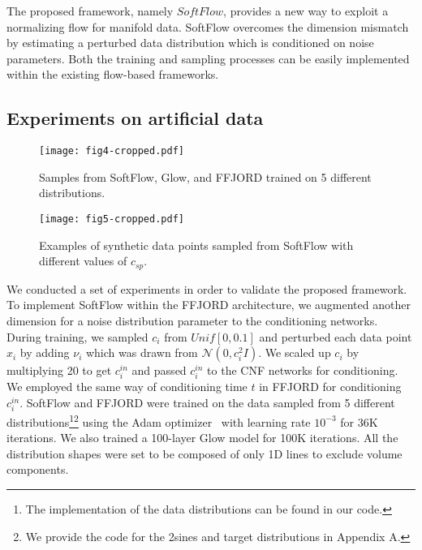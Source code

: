 \documentclass{article}
\begin{document}
The proposed framework, namely $\textit{SoftFlow}$, provides a new way to exploit a normalizing flow for manifold data. SoftFlow overcomes the dimension mismatch by estimating a perturbed data distribution which is conditioned on noise parameters. Both the training and sampling processes can be easily implemented within the existing flow-based frameworks.


\subsection{Experiments on artificial data}
\begin{figure}[t]
	\centering
	\hspace*{-0.57in}
	\texttt{[image: fig4-cropped.pdf]}
    \caption{Samples from SoftFlow, Glow, and FFJORD trained on 5 different distributions.}
	\label{fig:fig4}
\end{figure}
\begin{figure}[t]
	\centering
	\texttt{[image: fig5-cropped.pdf]}
    \caption{Examples of synthetic data points sampled from SoftFlow with different values of $c_{sp}$.}
	\label{fig:fig5}
\end{figure}


We conducted a set of experiments in order to validate the proposed framework. To implement SoftFlow within the FFJORD architecture, we augmented another dimension for a noise distribution parameter to the conditioning networks.
During training, we sampled $c_{i}$ from $Unif[0,0.1]$ and perturbed each data point $x_{i}$ by adding $\nu_{i}$ which was drawn from $\mathcal{N}({0}, c^{2}_{i}I)$. We scaled up $c_{i}$ by multiplying 20 to get $c^{in}_{i}$ and passed $c^{in}_{i}$ to the CNF networks for conditioning. 
We employed the same way of conditioning time $t$ in FFJORD for conditioning $c^{in}_{i}$. 
SoftFlow and FFJORD were trained on the data sampled from 5 different distributions\footnote{The implementation of the data distributions can be found in our code.}\footnote{We provide the code for the 2sines and target distributions in Appendix A.} using the Adam optimizer~\citep{kingma2014adam} with learning rate $10^{-3}$ for 36K iterations. 
We also trained a 100-layer Glow model for 100K iterations. 
All the distribution shapes were set to be composed of only 1D lines to exclude volume components.
\end{document}
